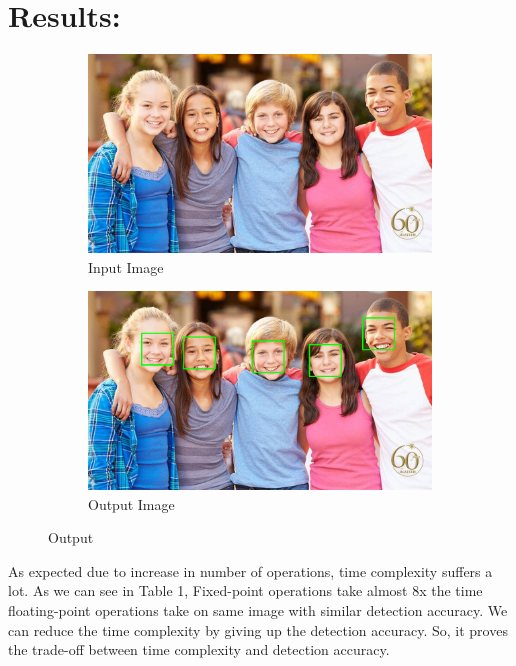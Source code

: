 \documentclass[12pt]{elsarticle}
\begin{document}
\section{Results:}
\label{S:3}

\begin{figure}
\begin{subfigure}[ht]{0.5\linewidth}
\includegraphics[width=\linewidth]{input.jpg}
\caption{Input Image}
\end{subfigure}
\hfill
\begin{subfigure}[ht]{0.5\linewidth}
\includegraphics[width=\linewidth]{output.png}
\caption{Output Image}
\end{subfigure}%
\caption{Output}
\end{figure}

As expected due to increase in number of operations, time complexity suffers a lot. As we can see in Table 1, Fixed-point operations take almost 8x the time floating-point operations take on same image with similar detection accuracy. We can reduce the time complexity by giving up the detection accuracy. So, it proves the trade-off between time complexity and detection accuracy.\\
\end{document}
